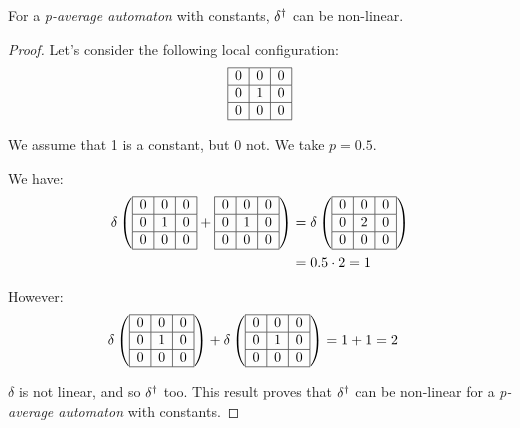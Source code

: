 \begin{question}

 \begin{prop}
    For a \textit{p-average automaton} with constants, $\delta^{\dag}$ can be non-linear.
 \end{prop}

 \begin{proof}
   Let's consider the following local configuration:
   \[\begin{array}{ | c | c | c |} \hline
    0 & 0 & 0 \\ \hline
    0 & 1 & 0 \\ \hline
    0 & 0 & 0 \\ \hline
  \end{array}\]
  
  We assume that 1 is a constant, but 0 not. We take $p=0.5$.
  
  We have:
 \[\begin{split}
 \delta \left(\begin{array}{ | c | c | c |} \hline
  0 & 0 & 0 \\ \hline
  0 & 1 & 0 \\ \hline
  0 & 0 & 0 \\ \hline
 \end{array} + \begin{array}{ | c | c | c |} \hline
  0 & 0 & 0 \\ \hline
  0 & 1 & 0 \\ \hline
  0 & 0 & 0 \\ \hline
 \end{array} \right) & = \delta \left(\begin{array}{ | c | c | c |} \hline
  0 & 0 & 0 \\ \hline
  0 & 2 & 0 \\ \hline
  0 & 0 & 0 \\ \hline
 \end{array} \right) \\
		     & = 0.5 \cdot 2 = 1    
 \end{split}\]  
  
  However:
 \[\begin{split}
 \delta \left(\begin{array}{ | c | c | c |} \hline
  0 & 0 & 0 \\ \hline
  0 & 1 & 0 \\ \hline
  0 & 0 & 0 \\ \hline
 \end{array}\right) + \delta \left(\begin{array}{ | c | c | c |} \hline
  0 & 0 & 0 \\ \hline
  0 & 1 & 0 \\ \hline
  0 & 0 & 0 \\ \hline
 \end{array} \right) & = 1 + 1 = 2
 \end{split}\]  
  
 $\delta$ is not linear, and so $\delta^{\dag}$ too. This result proves that $\delta^{\dag}$ can be non-linear for a \textit{p-average automaton} with constants.
 \end{proof}

\end{question}

